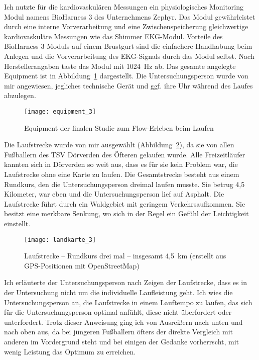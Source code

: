 Ich nutzte für die kardiovaskulären Messungen ein physiologisches Monitoring Modul namens BioHarness 3 des Unternehmens Zephyr. Das Modul gewährleistet durch eine interne Vorverarbeitung und eine Zwischenspeicherung gleichwertige kardiovaskuläre Messungen wie das Shimmer \ac{EKG}-Modul. Vorteile des BioHarness 3 Moduls auf einem Brustgurt sind die einfachere Handhabung beim Anlegen und die Vorverarbeitung des \ac{EKG}-Signals durch das Modul selbst. Nach Herstellerangaben taste das Modul mit 1024~Hz ab. Das gesamte angelegte Equipment ist in Abbildung~\ref{fig:equipment_3} dargestellt. Die Untersuchungsperson wurde von mir angewiesen, jegliches technische Gerät und ggf. ihre Uhr während des Laufes abzulegen. 
\begin{figure}
	[!htb] \centering 
	\texttt{[image: equipment\_3]} \caption[Equipment (Finale Studie: Laufen)]{Equipment der finalen Studie zum Flow-Erleben beim Laufen} \label{fig:equipment_3} 
\end{figure}

Die Laufstrecke wurde von mir ausgewählt (Abbildung~\ref{fig:landkarte_3}), da sie von allen Fußballern des TSV Dörverden des Öfteren gelaufen wurde. Alle Freizeitläufer kannten sich in Dörverden so weit aus, dass es für sie kein Problem war, die Laufstrecke ohne eine Karte zu laufen. Die Gesamtstrecke besteht aus einem Rundkurs, den die Untersuchungsperson dreimal laufen musste. Sie betrug 4,5 Kilometer, war eben und die Untersuchungsperson lief auf Asphalt. Die Laufstrecke führt durch ein Waldgebiet mit geringem Verkehrsaufkommen. Sie besitzt eine merkbare Senkung, wo sich in der Regel ein Gefühl der Leichtigkeit einstellt. 
\begin{figure}
	[!htb] \centering 
	\texttt{[image: landkarte\_3]} \caption[Laufstrecke -- Rundkurs]{Laufstrecke -- Rundkurs drei mal -- insgesamt 4,5~km (erstellt aus \acs{GPS}-Positionen mit OpenStreetMap)} \label{fig:landkarte_3} 
\end{figure}

Ich erläuterte der Untersuchungsperson nach Zeigen der Laufstrecke, dass es in der Untersuchung nicht um die individuelle Laufleistung geht. Ich wies die Untersuchungsperson an, die Laufstrecke in einem Lauftempo zu laufen, das sich für die Untersuchungsperson optimal anfühlt, diese nicht überfordert oder unterfordert. Trotz dieser Anweisung ging ich von Ausreißern nach unten und nach oben aus, da bei jüngeren Fußballern öfters der direkte Vergleich mit anderen im Vordergrund steht und bei einigen der Gedanke vorherrscht, mit wenig Leistung das Optimum zu erreichen. 

